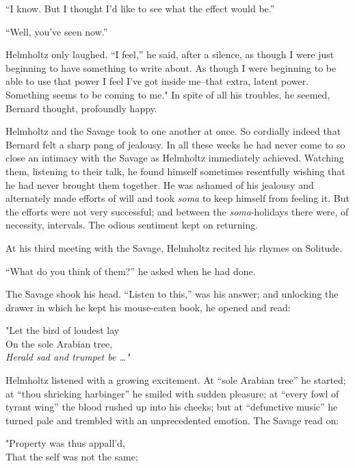\documentclass[12pt]{report}
\begin{document}
``I know. But I thought I'd like to see what the effect would be.''

``Well, you've seen now.''

Helmholtz only laughed. ``I feel,'' he said, after a silence, as though
I were just beginning to have something to write about. As though I were
beginning to be able to use that power I feel I've got inside me--that
extra, latent power. Something seems to be coming to me." In spite of
all his troubles, he seemed, Bernard thought, profoundly happy.

Helmholtz and the Savage took to one another at once. So cordially
indeed that Bernard felt a sharp pang of jealousy. In all these weeks he
had never come to so close an intimacy with the Savage as Helmholtz
immediately achieved. Watching them, listening to their talk, he found
himself sometimes resentfully wishing that he had never brought them
together. He was ashamed of his jealousy and alternately made efforts of
will and took \emph{soma} to keep himself from feeling it. But the
efforts were not very successful; and between the \emph{soma}-holidays
there were, of necessity, intervals. The odious sentiment kept on
returning.

At his third meeting with the Savage, Helmholtz recited his rhymes on
Solitude.

``What do you think of them?'' he asked when he had done.

The Savage shook his head. ``Listen to this,'' was his answer; and
unlocking the drawer in which he kept his mouse-eaten book, he opened
and read:

\emph{}

"Let the bird of loudest lay\\

On the sole Arabian tree,\\

\emph{Herald sad and trumpet be \ldots{}"\\
}

Helmholtz listened with a growing excitement. At ``sole Arabian tree''
he started; at ``thou shrieking harbinger'' he smiled with sudden
pleasure; at ``every fowl of tyrant wing'' the blood rushed up into his
cheeks; but at ``defunctive music'' he turned pale and trembled with an
unprecedented emotion. The Savage read on:

\emph{}

"Property was thus appall'd,\\

That the self was not the same;\\
\end{document}
